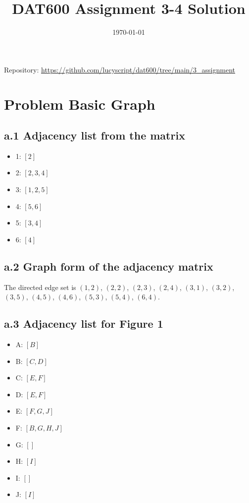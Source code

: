 \documentclass[11pt]{article}
\title{DAT600 Assignment 3-4 Solution}
\date{\today}
\begin{document}
\maketitle
Repository: \url{https://github.com/lucyscript/dat600/tree/main/3_assignment}
\section{Problem Basic Graph}
\subsection*{a.1 Adjacency list from the matrix}
\begin{itemize}
\item 1: \([2]\)
\item 2: \([2, 3, 4]\)
\item 3: \([1, 2, 5]\)
\item 4: \([5, 6]\)
\item 5: \([3, 4]\)
\item 6: \([4]\)
\end{itemize}
\subsection*{a.2 Graph form of the adjacency matrix}
The directed edge set is \((1, 2)\), \((2, 2)\), \((2, 3)\), \((2, 4)\), \((3, 1)\), \((3, 2)\), \((3, 5)\), \((4, 5)\), \((4, 6)\), \((5, 3)\), \((5, 4)\), \((6, 4)\).
\subsection*{a.3 Adjacency list for Figure 1}
\begin{itemize}
\item A: \([B]\)
\item B: \([C, D]\)
\item C: \([E, F]\)
\item D: \([E, F]\)
\item E: \([F, G, J]\)
\item F: \([B, G, H, J]\)
\item G: \([]\)
\item H: \([I]\)
\item I: \([]\)
\item J: \([I]\)
\end{itemize}
\end{document}
